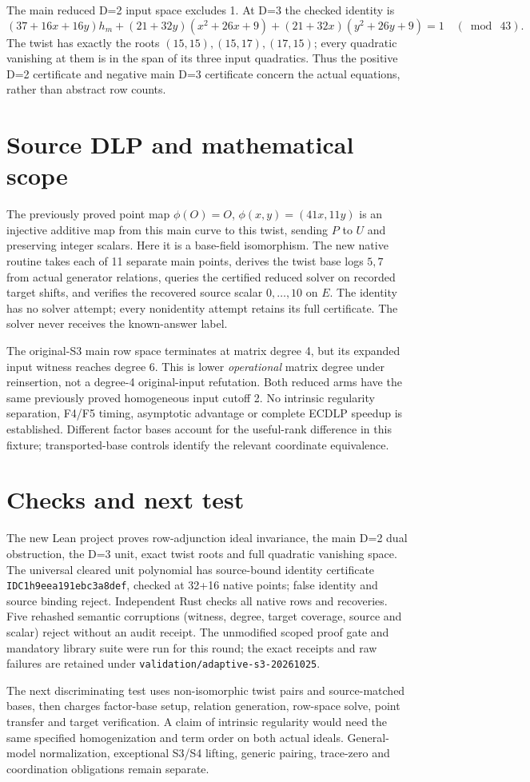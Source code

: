 \documentclass[10pt]{article}
\begin{document}
The main reduced D=2 input space excludes 1. At D=3 the checked identity is
\[
(37+16x+16y)h_m+(21+32y)(x^2+26x+9)
 +(21+32x)(y^2+26y+9)=1\quad(\bmod\ 43).
\]
The twist has exactly the roots $(15,15),(15,17),(17,15)$; every quadratic
vanishing at them is in the span of its three input quadratics. Thus the
positive D=2 certificate and negative main D=3 certificate concern the actual
equations, rather than abstract row counts.

\section*{Source DLP and mathematical scope}
The previously proved point map $\phi(O)=O$,
$\phi(x,y)=(41x,11y)$ is an injective additive map from this main curve to
this twist, sending $P$ to $U$ and preserving integer scalars. Here it is a
base-field isomorphism. The new native routine takes each of 11 separate main
points, derives the twist base logs $5,7$ from actual generator relations,
queries the certified reduced solver on recorded target shifts, and verifies
the recovered source scalar $0,\ldots,10$ on $E$. The identity has no solver
attempt; every nonidentity attempt retains its full certificate. The solver
never receives the known-answer label.

The original-S3 main row space terminates at matrix degree 4, but its
expanded input witness reaches degree 6. This is lower \emph{operational}
matrix degree under reinsertion, not a degree-4 original-input refutation.
Both reduced arms have the same previously proved homogeneous input cutoff 2.
No intrinsic regularity separation, F4/F5 timing, asymptotic advantage or
complete ECDLP speedup is established. Different factor bases account for the
useful-rank difference in this fixture; transported-base controls identify
the relevant coordinate equivalence.

\section*{Checks and next test}
The new Lean project proves row-adjunction ideal invariance, the main D=2
dual obstruction, the D=3 unit, exact twist roots and full quadratic vanishing
space. The universal cleared unit polynomial has source-bound identity
certificate \texttt{IDC1h9eea191ebc3a8def}, checked at 32+16 native points;
false identity and source binding reject. Independent Rust checks all native
rows and recoveries. Five rehashed semantic corruptions (witness, degree,
target coverage, source and scalar) reject without an audit receipt. The
unmodified scoped proof gate and mandatory library suite were run for this
round; the exact receipts and raw failures are retained under
\texttt{validation/adaptive-s3-20261025}.

The next discriminating test uses non-isomorphic twist pairs and source-matched
bases, then charges factor-base setup, relation generation, row-space solve,
point transfer and target verification. A claim of intrinsic regularity would
need the same specified homogenization and term order on both actual ideals.
General-model normalization, exceptional S3/S4 lifting, generic pairing,
trace-zero and coordination obligations remain separate.
\end{document}
